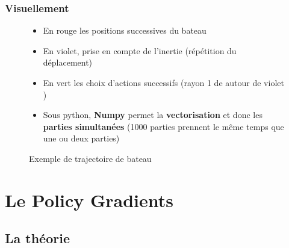 \documentclass[8pt]{beamer}
\begin{document}
\begin{frame}

  \frametitle{Visuellement}

  \begin{figure}
    \begin{minipage}[c]{.46\linewidth}
      \centering
      
      \caption{Exemple de trajectoire de bateau}
    \end{minipage}
    \hfill%
    \begin{minipage}[c]{.46\linewidth}
      \centering
      \begin{itemize}
      \item En {\color{red} rouge} les positions successives du bateau
      \item En {\color{purple} violet}, prise en compte de l'inertie (répétition du déplacement)
      \item En {\color{green} vert} les choix d'actions successifs (rayon 1 de autour de {\color{purple}violet} \footnotemark)
      \item Sous python, \textbf{Numpy} permet la \textbf{vectorisation} et donc les \textbf{parties simultanées} (1000 parties prennent le même temps que une ou deux parties)
      \end{itemize}
    \end{minipage}
  \end{figure}

\end{frame}


\section{Le Policy Gradients}

\subsection{La théorie}
\end{document}
